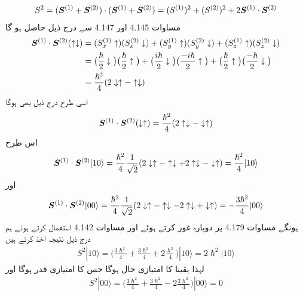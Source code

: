 \begin{align}
S^2 = ({{\boldsymbol{S}}}^{(1)} + {{\boldsymbol{S}}}^{(2)}) \cdot ({{\boldsymbol{S}}}^{(1)} + {{\boldsymbol{S}}}^{(2)}) = (S^{(1)})^2 + (S^{(2)})^2 + 2 {{\boldsymbol{S}}}^{(1)} \cdot {\ensuremath{{\boldsymbol{S}}}}^{(2)}
\end{align}
مساوات 4.145 اور 4.147 سے درج ذیل حاصل ہو گا 
\begin{align*}
{\ensuremath{{\boldsymbol{S}}}}^{(1)} \cdot {\ensuremath{{\boldsymbol{S}}}}^{(2)} (\uparrow \downarrow) &= (S_x^{(1)} \uparrow) (S_x^{(2)} \downarrow) + (S_y^{(1)} \uparrow) (S_y^{(2)} \downarrow) + (S_z^{(1)} \uparrow) (S_z^{(2)} \downarrow) \\
&= \big ( \frac{\hslash}{2} \downarrow \big ) \big ( \frac{\hslash}{2} \uparrow \big ) + \big ( \frac{i \hslash}{2} \downarrow \big ) \big ( \frac{- i \hslash}{2} \uparrow \big ) + \big ( \frac{\hslash}{2} \uparrow \big ) \big ( \frac{- \hslash}{2} \downarrow \big ) \\
&= \frac{\hslash^2}{4} (2 \downarrow \uparrow - \uparrow \downarrow)
\end{align*}
اسی طرح درج ذیل بھی ہوگا 
\begin{align*}
{\ensuremath{{\boldsymbol{S}}}}^{(1)} \cdot {\ensuremath{{\boldsymbol{S}}}}^{(2)} (\downarrow \uparrow) = \frac{\hslash^2}{4} (2 \uparrow \downarrow - \downarrow \uparrow)
\end{align*}
اس طرح 
\begin{align}
{\ensuremath{{\boldsymbol{S}}}}^{(1)} \cdot {\ensuremath{{\boldsymbol{S}}}}^{(2)} | 1 0 \rangle = \frac{\hslash^2}{4} \frac{1}{\sqrt{2}} (2 \downarrow \uparrow - \uparrow \downarrow + 2 \uparrow \downarrow - \downarrow \uparrow) = \frac{\hslash^2}{4} | 1 0 \rangle
\end{align}
اور
\begin{align}
{\ensuremath{{\boldsymbol{S}}}}^{(1)} \cdot {\ensuremath{{\boldsymbol{S}}}}^{(2)} | 0 0 \rangle = \frac{\hslash^2}{4} \frac{1}{\sqrt{2}} (2 \downarrow \uparrow - \uparrow \downarrow - 2 \uparrow \downarrow + \downarrow \uparrow) = -\frac{3\hslash^2}{4} | 0 0 \rangle
\end{align}
ہونگے مساوات 4.179 پر دوبارہ غور کرتے ہوئے اور مساوات 4.142 استعمال کرتے ہوئے ہم درج ذیل نتیجہ اخذ کرتے ہیں 
\begin{align}
S^2 | 1 0 \rangle = \big ( \frac{3\hslash^2}{4} + \frac{3\hslash^2}{4} +2 \frac{ \hslash^2}{4} \big ) | 1 0 \rangle =2\hslash^2 |1 0\rangle
\end{align}
لہذا  یقینا  کا امتیازی حال ہوگا جس کا امتیازی قدر  ہوگا اور 
\begin{align}
S^2 | 0 0 \rangle = \big ( \frac{3\hslash^2}{4} + \frac{3\hslash^2}{4} -2 \frac{3 \hslash^2}{4} \big ) | 0 0 \rangle =0
\end{align}
